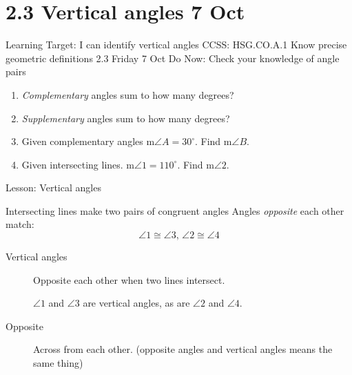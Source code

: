 \section{2.3 Vertical angles \hfill 7 Oct}
\begin{frame}{Learning Target: I can identify vertical angles}
  {CCSS: HSG.CO.A.1 Know precise geometric definitions  \hfill \alert{2.3 Friday 7 Oct}}
    Do Now: Check your knowledge of angle pairs
      \begin{enumerate}
        \item \emph{Complementary} angles sum to how many degrees?
        \item \emph{Supplementary} angles sum to how many degrees?
        \item Given complementary angles m$\angle A= 30^\circ$. Find m$\angle B$.
        \item Given intersecting lines. m$\angle 1 = 110^\circ$. Find m$\angle 2$. \medskip
          \begin{flushright}
          \end{flushright}
      \end{enumerate}
    Lesson: Vertical angles
  \end{frame}

\begin{frame}{Intersecting lines make two pairs of congruent angles}
  Angles \emph{opposite} each other match: 
    $$\angle 1 \cong \angle 3 \text{, } \angle 2 \cong \angle 4$$
  \begin{center}
  \end{center}
\begin{description}
  \item[Vertical angles] Opposite each other when two lines intersect. \par 
    $\angle 1$ and $\angle 3$ are vertical angles, as are $\angle 2$ and $\angle 4$.
  \item[Opposite] Across from each other. (opposite angles and vertical angles means the same thing)
\end{description}
\end{frame}

